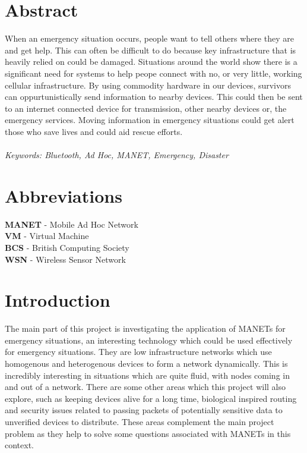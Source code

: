 \documentclass{report}
\begin{document}
\chapter*{Abstract}

When an emergency situation occurs, people want to tell others where they are and get help. 
This can often be difficult to do because key infrastructure that is heavily relied on could be damaged.
Situations around the world show there is a significant need for systems to help peope connect with no, or very little, working cellular infrastructure. 
By using commodity hardware in our devices, survivors can oppurtunistically send information to nearby devices. 
This could then be sent to an internet connected device for transmission, other nearby devices or, the emergency services. 
Moving information in emergency situations could get alert those who save lives and could aid rescue efforts.
\\
\\
\textit{Keywords: Bluetooth, Ad Hoc, MANET, Emergency, Disaster}



\chapter*{Abbreviations}

\textbf{MANET} - Mobile Ad Hoc Network\\
\textbf{VM} - Virtual Machine\\
\textbf{BCS} - British Computing Society\\
\textbf{WSN} - Wireless Sensor Network\\




\chapter*{Introduction}

The main part of this project is investigating the application of MANETs for emergency situations, an interesting technology which could be used
effectively for emergency situations. They are low infrastructure networks which use homogenous and heterogenous devices to form a 
network dynamically. This is incredibly interesting in situations which are quite fluid, with nodes coming in and out of a network\cite{sun2001mobile}. 
There are some other areas which this project will also explore, such as keeping devices alive for a long time, biological 
inspired routing and security issues related to passing packets of potentially sensitive data to unverified devices to distribute. These areas complement 
the main project problem as they help to solve some questions associated with MANETs in this context.
\end{document}
